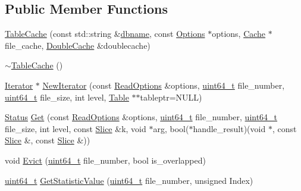 \subsection*{Public Member Functions}
\begin{DoxyCompactItemize}
\item 
\hyperlink{classleveldb_1_1_table_cache_aed9d8dba0a30fb8ae367c43f0849c436}{Table\+Cache} (const std\+::string \&\hyperlink{c__test_8c_a75d845559336df6843f3b599960f89d2}{dbname}, const \hyperlink{structleveldb_1_1_options}{Options} $\ast$options, \hyperlink{classleveldb_1_1_cache}{Cache} $\ast$file\+\_\+cache, \hyperlink{classleveldb_1_1_double_cache}{Double\+Cache} \&doublecache)
\item 
\hyperlink{classleveldb_1_1_table_cache_a5690fd10ea7cc7f0d44c8e768bea872c}{$\sim$\+Table\+Cache} ()
\item 
\hyperlink{classleveldb_1_1_iterator}{Iterator} $\ast$ \hyperlink{classleveldb_1_1_table_cache_a6a7d41238620ed3adcb4b9ac776500d7}{New\+Iterator} (const \hyperlink{structleveldb_1_1_read_options}{Read\+Options} \&options, \hyperlink{stdint_8h_aaa5d1cd013383c889537491c3cfd9aad}{uint64\+\_\+t} file\+\_\+number, \hyperlink{stdint_8h_aaa5d1cd013383c889537491c3cfd9aad}{uint64\+\_\+t} file\+\_\+size, int level, \hyperlink{classleveldb_1_1_table}{Table} $\ast$$\ast$tableptr=N\+U\+L\+L)
\item 
\hyperlink{classleveldb_1_1_status}{Status} \hyperlink{classleveldb_1_1_table_cache_af25b62b813a8747b901599aab159a91c}{Get} (const \hyperlink{structleveldb_1_1_read_options}{Read\+Options} \&options, \hyperlink{stdint_8h_aaa5d1cd013383c889537491c3cfd9aad}{uint64\+\_\+t} file\+\_\+number, \hyperlink{stdint_8h_aaa5d1cd013383c889537491c3cfd9aad}{uint64\+\_\+t} file\+\_\+size, int level, const \hyperlink{classleveldb_1_1_slice}{Slice} \&k, void $\ast$arg, bool($\ast$handle\+\_\+result)(void $\ast$, const \hyperlink{classleveldb_1_1_slice}{Slice} \&, const \hyperlink{classleveldb_1_1_slice}{Slice} \&))
\item 
void \hyperlink{classleveldb_1_1_table_cache_a2975b40199b435d466150bcb282e889a}{Evict} (\hyperlink{stdint_8h_aaa5d1cd013383c889537491c3cfd9aad}{uint64\+\_\+t} file\+\_\+number, bool is\+\_\+overlapped)
\item 
\hyperlink{stdint_8h_aaa5d1cd013383c889537491c3cfd9aad}{uint64\+\_\+t} \hyperlink{classleveldb_1_1_table_cache_a9b79825e8680437dcc55122b07bf83c9}{Get\+Statistic\+Value} (\hyperlink{stdint_8h_aaa5d1cd013383c889537491c3cfd9aad}{uint64\+\_\+t} file\+\_\+number, unsigned Index)
\item 
$$
\end{DoxyCompactItemize}
